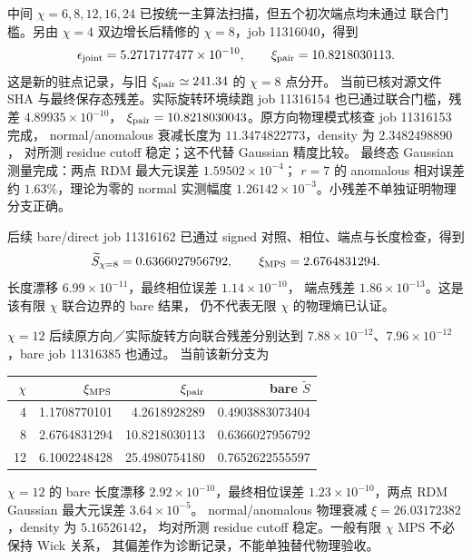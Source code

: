 中间 $\chi=6,8,12,16,24$ 已按统一主算法扫描，但五个初次端点均未通过
联合门槛。另由 $\chi=4$ 双边增长后精修的 $\chi=8$，job 11316040，得到
\begin{equation}
 \epsilon_{\rm joint}=5.2717177477\times10^{-10},\qquad
 \xi_{\rm pair}=10.8218030113.
\end{equation}
这是新的驻点记录，与旧 $\xi_{\rm pair}\simeq241.34$ 的 $\chi=8$ 点分开。
当前已核对源文件 SHA 与最终保存态残差。实际旋转环境续跑 job 11316154
也已通过联合门槛，残差 $4.89935\times10^{-10}$，
$\xi_{\rm pair}=10.8218030043$。原方向物理模式核查 job 11316153 完成，
normal/anomalous 衰减长度为 $11.3474822773$，density 为 $2.3482498890$，
对所测 residue cutoff 稳定；这不代替 Gaussian 精度比较。
最终态 Gaussian 测量完成：两点 RDM 最大元误差 $1.59502\times10^{-4}$；
$r=7$ 的 anomalous 相对误差约 $1.63\%$，理论为零的 normal 实测幅度
$1.26142\times10^{-3}$。小残差不单独证明物理分支正确。

后续 bare/direct job 11316162 已通过 signed 对照、相位、端点与长度检查，得到
\begin{equation}
 \widetilde S_{\chi=8}=0.6366027956792,\qquad
 \xi_{\rm MPS}=2.6764831294.
\end{equation}
长度漂移 $6.99\times10^{-11}$，最终相位误差 $1.14\times10^{-10}$，
端点残差 $1.86\times10^{-13}$。这是该有限 $\chi$ 联合边界的 bare 结果，
仍不代表无限 $\chi$ 的物理熵已认证。

$\chi=12$ 后续原方向／实际旋转方向联合残差分别达到
$7.88\times10^{-12}$、$7.96\times10^{-12}$，bare job 11316385 也通过。
当前该新分支为
\begin{center}
\begin{tabular}{rrrr}
\toprule
$\chi$ & $\xi_{\rm MPS}$ & $\xi_{\rm pair}$ & bare $\widetilde S$\\
\midrule
4 & 1.1708770101 & 4.2618928289 & 0.4903883073404\\
8 & 2.6764831294 & 10.8218030113 & 0.6366027956792\\
12 & 6.1002248428 & 25.4980754180 & 0.7652622555597\\
\bottomrule
\end{tabular}
\end{center}
$\chi=12$ 的 bare 长度漂移 $2.92\times10^{-10}$，最终相位误差
$1.23\times10^{-10}$，两点 RDM Gaussian 最大元误差 $3.64\times10^{-5}$。
normal/anomalous 物理衰减 $\xi=26.03172382$，density 为 $5.16526142$，
均对所测 residue cutoff 稳定。一般有限 $\chi$ MPS 不必保持 Wick 关系，
其偏差作为诊断记录，不能单独替代物理验收。

